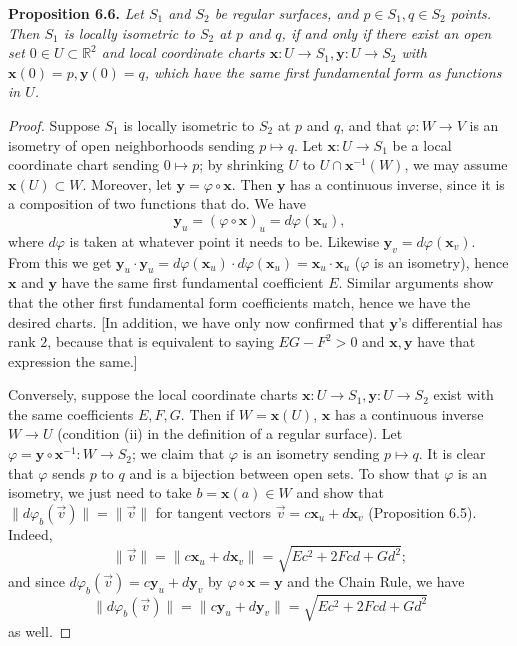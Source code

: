 \documentclass[leqno]{book}
\begin{document}
\noindent\textbf{Proposition 6.6.} \emph{Let $S_1$ and $S_2$ be regular surfaces, and $p\in S_1,q\in S_2$ points.  Then $S_1$ is locally isometric to $S_2$ at $p$ and $q$, if and only if there exist an open set $0\in U\subset\mathbb R^2$ and local coordinate charts $\mathbf x:U\to S_1,\mathbf y:U\to S_2$ with $\mathbf x(0)=p,\mathbf y(0)=q$, which have the same first fundamental form as functions in $U$.}
\begin{proof}
Suppose $S_1$ is locally isometric to $S_2$ at $p$ and $q$, and that $\varphi:W\to V$ is an isometry of open neighborhoods sending $p\mapsto q$.  Let $\mathbf x:U\to S_1$ be a local coordinate chart sending $0\mapsto p$; by shrinking $U$ to $U\cap\mathbf x^{-1}(W)$, we may assume $\mathbf x(U)\subset W$.  Moreover, let $\mathbf y=\varphi\circ\mathbf x$.  Then $\mathbf y$ has a continuous inverse, since it is a composition of two functions that do.  We have
$$\mathbf y_u=(\varphi\circ\mathbf x)_u=d\varphi(\mathbf x_u),$$
where $d\varphi$ is taken at whatever point it needs to be.  Likewise $\mathbf y_v=d\varphi(\mathbf x_v)$.  From this we get $\mathbf y_u\cdot\mathbf y_u=d\varphi(\mathbf x_u)\cdot d\varphi(\mathbf x_u)=\mathbf x_u\cdot\mathbf x_u$ ($\varphi$ is an isometry), hence $\mathbf x$ and $\mathbf y$ have the same first fundamental coefficient $E$.  Similar arguments show that the other first fundamental form coefficients match, hence we have the desired charts.  [In addition, we have only now confirmed that $\mathbf y$'s differential has rank $2$, because that is equivalent to saying $EG-F^2>0$ and $\mathbf x,\mathbf y$ have that expression the same.]

Conversely, suppose the local coordinate charts $\mathbf x:U\to S_1,\mathbf y:U\to S_2$ exist with the same coefficients $E,F,G$.  Then if $W=\mathbf x(U)$, $\mathbf x$ has a continuous inverse $W\to U$ (condition (ii) in the definition of a regular surface).  Let $\varphi=\mathbf y\circ\mathbf x^{-1}:W\to S_2$; we claim that $\varphi$ is an isometry sending $p\mapsto q$.  It is clear that $\varphi$ sends $p$ to $q$ and is a bijection between open sets.  To show that $\varphi$ is an isometry, we just need to take $b=\mathbf x(a)\in W$ and show that $\|d\varphi_b(\vec v)\|=\|\vec v\|$ for tangent vectors $\vec v=c\mathbf x_u+d\mathbf x_v$ (Proposition 6.5).  Indeed,
$$\|\vec v\|=\|c\mathbf x_u+d\mathbf x_v\|=\sqrt{Ec^2+2Fcd+Gd^2};$$
and since $d\varphi_b(\vec v)=c\mathbf y_u+d\mathbf y_v$ by $\varphi\circ\mathbf x=\mathbf y$ and the Chain Rule, we have
$$\|d\varphi_b(\vec v)\|=\|c\mathbf y_u+d\mathbf y_v\|=\sqrt{Ec^2+2Fcd+Gd^2}$$
as well.
\end{proof}
\end{document}
